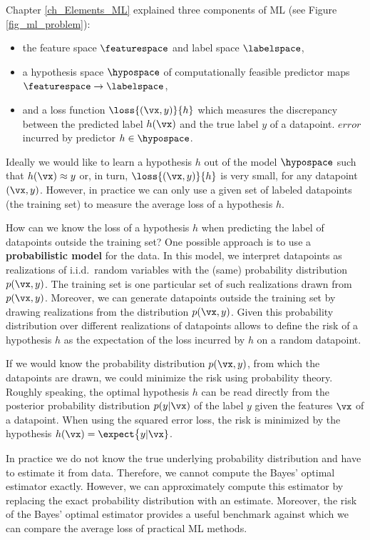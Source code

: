 \documentclass[12pt]{report}
\begin{document}
Chapter \ref{ch_Elements_ML} explained three components of ML (see Figure \ref{fig_ml_problem}): 
\begin{itemize} 
\item the feature space $\featurespace$ and label space $\labelspace$, 
\item a hypothesis space $\hypospace$ of computationally feasible predictor maps $\featurespace \rightarrow \labelspace$, 
\item and a loss function $\loss{(\vx,y)}{h}$ which measures the discrepancy between the predicted label $h(\vx)$ and 
the true label $y$ of a datapoint. $ error $ incurred by predictor $h \in \hypospace$. 
\end{itemize} 
Ideally we would like to learn a hypothesis $h$ out of the model $\hypospace$ 
such that $h(\vx) \approx y$ or, in turn,  $\loss{(\vx,y)}{h}$ is very small, 
for any datapoint $(\vx,y)$. However, in practice we can only use a given 
set of labeled datapoints (the training set) to measure the average loss 
of a hypothesis $h$. 

How can we know the loss of a hypothesis $h$ when predicting the label 
of datapoints outside the training set? One possible approach is to use 
a {\bf probabilistic model} for the data. In this model, we interpret datapoints 
as realizations of i.i.d. random variables with the (same) probability distribution 
$p(\vx,y)$. The training set is one particular set of such realizations drawn 
from $p(\vx,y)$. Moreover, we can generate datapoints outside the training 
set by drawing realizations from the distribution $p(\vx,y)$. Given this probability 
distribution over different realizations of datapoints allows to define the risk 
of a hypothesis $h$ as the expectation of the loss incurred by $h$ on a 
random datapoint. 

If we would know the probability distribution $p(\vx,y)$, from which the datapoints 
are drawn, we could minimize the risk using probability theory. 
Roughly speaking, the optimal hypothesis $h$ can be read directly from the 
posterior probability distribution $p(y|\vx)$ of the label $y$ 
given the features $\vx$ of a datapoint. When using the squared error loss, 
the risk is minimized by the hypothesis $h(\vx) = \expect \big\{ y | \vx \}$. 

In practice we do not know the true underlying probability 
distribution and have to estimate it from data. Therefore, 
we cannot compute the Bayes' optimal estimator exactly. 
However, we can approximately compute this estimator 
by replacing the exact probability distribution with an 
estimate. Moreover, the risk of the Bayes' optimal estimator 
provides a useful benchmark against which we can compare 
the average loss of practical ML methods. 
\end{document}
